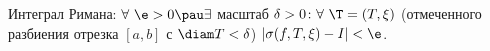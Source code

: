 
 	Интеграл Римана: $\forall\ \e>0\pau\exists$ масштаб $\delta>0\colon\forall\ \T=(T,\xi)$ (отмеченного разбиения отрезка $[a,b]$ с $\diam T<\delta$)\pau
 	$|\sigma(f,T,\xi)-I|<\e$.
 
